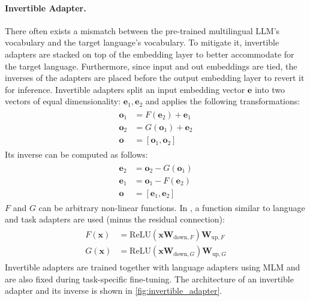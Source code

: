 \paragraph{Invertible Adapter.}
There often exists a mismatch between the pre-trained multilingual LLM's vocabulary and the target language's vocabulary. To mitigate it, invertible adapters are stacked on top of the embedding layer to better accommodate for the target language. Furthermore, since input and out embeddings are tied, the inverses of the adapters are placed before the output embedding layer to revert it for inference. Invertible adapters split an input embedding vector $\textbf{e}$ into two vectors of equal dimensionality: $\textbf{e}_1, \textbf{e}_2$ and applies the following transformations:
\begin{align}
\begin{split}
    \textbf{o}_1 &= F(\textbf{e}_2) + \textbf{e}_1\\
    \textbf{o}_2 &= G(\textbf{o}_1) + \textbf{e}_2 \\
    \textbf{o} &= [\textbf{o}_1, \textbf{o}_2]  
\end{split}
\end{align}
Its inverse can be computed as follows:
\begin{align}
\begin{split}
    \textbf{e}_2 &= \textbf{o}_2 - G(\textbf{o}_1)\\
    \textbf{e}_1 &= \textbf{o}_1 - F(\textbf{e}_2) \\
    \textbf{o} &= [\textbf{e}_1, \textbf{e}_2]  
\end{split}
\end{align}
$F$ and $G$ can be arbitrary non-linear functions. In \citet{pfeiffer-etal-2020-mad}, a function similar to language and task adapters are used (minus the residual connection):
\begin{align}
\begin{split}
    F(\textbf{x}) &= \text{ReLU}(\textbf{x}\textbf{W}_{\text{down},F})\textbf{W}_{\text{up},F} \\
    G(\textbf{x}) &= \text{ReLU}(\textbf{x}\textbf{W}_{\text{down},G})\textbf{W}_{\text{up},G}
\end{split}
\end{align}
Invertible adapters are trained together with language adapters using MLM and are also fixed during task-specific fine-tuning. The architecture of an invertible adapter and its inverse is shown in \cref{fig:invertible_adapter}.

